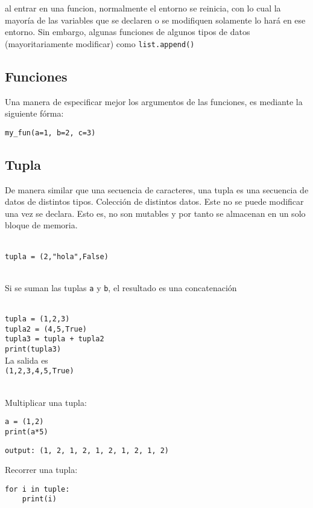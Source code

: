 al entrar en una funcion, normalmente el entorno se reinicia, con lo cual la
mayoría de las variables que se declaren o se modifiquen solamente lo hará en
ese entorno. Sin embargo, algunas funciones de algunos tipos de datos
(mayoritariamente modificar) como \texttt{list.append()}

\subsection{Funciones}

Una manera de especificar mejor los argumentos de las funciones, es mediante la
siguiente fórma:

\texttt{my\_fun(a=1, b=2, c=3)}

\subsection{Tupla}

De manera similar que una secuencia de caracteres, una tupla es una secuencia
de datos de distintos tipos. Colección de distintos datos. Este no se puede
modificar una vez se declara. Esto es, no son mutables y por tanto se almacenan
en un solo bloque de memoria.\\\

\texttt{tupla = (2,"hola",False)} \\\

Si se suman las tuplas \texttt{a} y \texttt{b}, el resultado es una
concatenación \\\

\texttt{tupla = (1,2,3)} \\
\texttt{tupla2 = (4,5,True)} \\
\texttt{tupla3 = tupla + tupla2} \\
\texttt{print(tupla3)} \\
La salida es\\
\texttt{(1,2,3,4,5,True)}\\\

Multiplicar una tupla:

\begin{verbatim}
a = (1,2)
print(a*5)
\end{verbatim}
\begin{lstlisting}
output: (1, 2, 1, 2, 1, 2, 1, 2, 1, 2)
\end{lstlisting}

Recorrer una tupla:
\begin{verbatim}
for i in tuple:
    print(i)
\end{verbatim}

